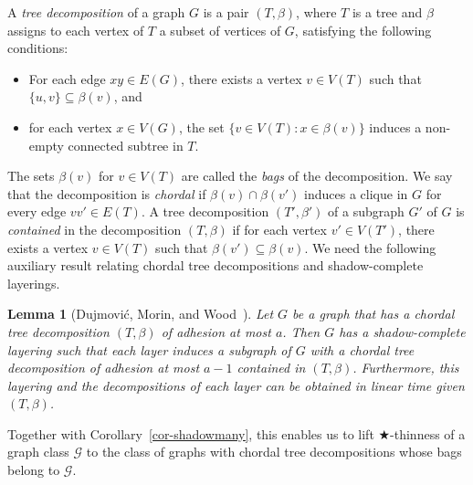 \documentclass[a4paper,11pt]{article}
\newcommand{\GG}{{\mathcal G}}
\newtheorem{lemma}[theorem]{Lemma}
\begin{document}
A \emph{tree decomposition} of a graph $G$ is a pair $(T,\beta)$, where $T$ is a tree and $\beta$ assigns to each vertex of $T$ a subset of
vertices of $G$, satisfying the following conditions:
\begin{itemize}
\item For each edge $xy\in E(G)$, there exists a vertex $v\in V(T)$ such that $\{u,v\}\subseteq \beta(v)$, and
\item for each vertex $x\in V(G)$, the set $\{v\in V(T):x\in\beta(v)\}$ induces a non-empty connected subtree in $T$.
\end{itemize}
The sets $\beta(v)$ for $v\in V(T)$ are called the \emph{bags} of the decomposition.
We say that the decomposition is \emph{chordal} if $\beta(v)\cap\beta(v')$ induces a clique in $G$ for every edge $vv'\in E(T)$.
A tree decomposition $(T',\beta')$ of a subgraph $G'$ of $G$ is \emph{contained} in the decomposition $(T,\beta)$ if for each vertex $v'\in V(T')$,
there exists a vertex $v\in V(T)$ such that $\beta(v')\subseteq\beta(v)$.  We need the following auxiliary result
relating chordal tree decompositions and shadow-complete layerings.

\begin{lemma}[Dujmovi\'{c}, Morin, and Wood~\cite{layers}]\label{lemma-redlay}
Let $G$ be a graph that has a chordal tree decomposition $(T,\beta)$ of adhesion at most $a$.
Then $G$ has a shadow-complete layering such that each layer induces a subgraph of $G$ with
a chordal tree decomposition of adhesion at most $a-1$ contained in $(T,\beta)$.
Furthermore, this layering and the decompositions of each layer can be obtained in linear time given $(T,\beta)$.
\end{lemma}

Together with Corollary~\ref{cor-shadowmany}, this enables us to lift $\bigstar$-thinness of a graph class $\GG$
to the class of graphs with chordal tree decompositions whose bags belong to $\GG$.
\end{document}
